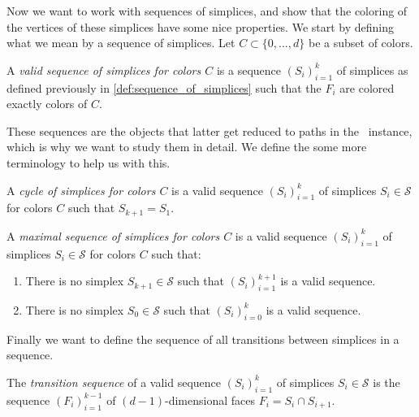Now we want to work with sequences of simplices, and show that the coloring of the vertices of these simplices have some nice properties. We start by defining what we mean by a sequence of simplices. Let $C \subset \{0, \dots, d\}$ be a subset of colors.
\begin{definition}
	\label{def:valid_sequence_simplices}
	A \emph{valid sequence of simplices for colors $C$} is a sequence $\left(S_i\right)_{i=1}^{k}$ of simplices as defined previously in \cref{def:sequence_of_simplices} such that the $F_i$ are colored exactly colors of $C$.
\end{definition}
These sequences are the objects that latter get reduced to paths in the \EndOfLine\ instance, which is why we want to study them in detail. We define the some more terminology to help us with this.
\begin{definition}[Cycle]
	A \emph{cycle of simplices for colors $C$} is a valid sequence $\left(S_i\right)_{i=1}^{k}$ of simplices $S_i \in \mathcal{S}$ for colors $C$ such that $S_{k+1} = S_1$.
\end{definition}
\begin{definition}
	A \emph{maximal sequence of simplices for colors $C$} is a valid sequence $\left(S_i\right)_{i=1}^{k}$ of simplices $S_i \in \mathcal{S}$ for colors $C$ such that:
	\begin{enumerate}
		\item There is no simplex $S_{k+1} \in \mathcal{S}$ such that $\left(S_i\right)_{i=1}^{k+1}$ is a valid sequence.
		\item There is no simplex $S_{0} \in \mathcal{S}$ such that $\left(S_i\right)_{i=0}^{k}$ is a valid sequence.
	\end{enumerate}
\end{definition}
Finally we want to define the sequence of all transitions between simplices in a sequence.
\begin{definition}
	The \emph{transition sequence} of a valid sequence $\left(S_i\right)_{i=1}^{k}$ of simplices $S_i \in \mathcal{S}$ is the sequence $\left(F_i\right)_{i=1}^{k-1}$ of $(d-1)$-dimensional faces $F_i = S_i \cap S_{i+1}$.
\end{definition}

